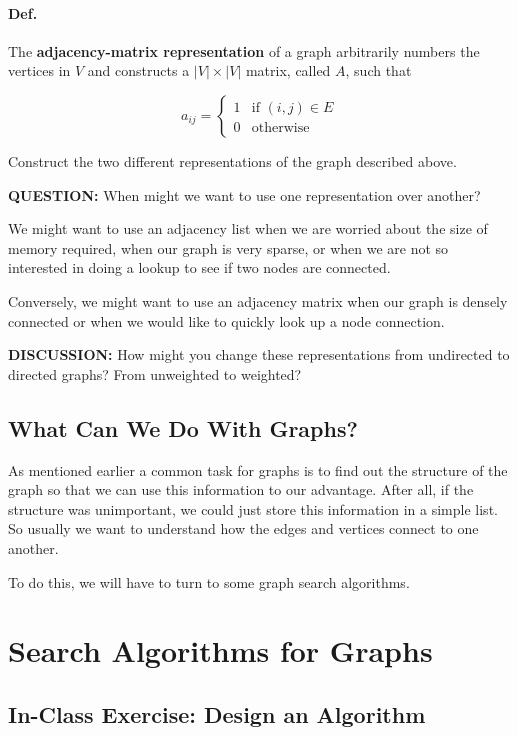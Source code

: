 \documentclass[12pt]{article}
\begin{document}
\paragraph{Def.} The \textbf{adjacency-matrix representation} of a graph arbitrarily numbers the vertices in $V$ and constructs a $|V| \times |V|$ matrix, called $A$, such that 

\begin{equation}
    a_{ij}=
    \begin{cases}
        1 & \text{if } (i, j) \in E\\
        0 & \text{otherwise}
    \end{cases}
\end{equation}

Construct the two different representations of the graph described above.

\textbf{QUESTION:} When might we want to use one representation over another? 

We might want to use an adjacency list when we are worried about the size of memory required, when our graph is very sparse, or when we are not so interested in doing a lookup to see if two nodes are connected.

Conversely, we might want to use an adjacency matrix when our graph is densely connected or when we would like to quickly look up a node connection. 

\textbf{DISCUSSION:} How might you change these representations from undirected to directed graphs? From unweighted to weighted? 

\subsection*{What Can We Do With Graphs?}

As mentioned earlier a common task for graphs is to find out the structure of the graph so that we can use this information to our advantage. After all, if the structure was unimportant, we could just store this information in a simple list. So usually we want to understand how the edges and vertices connect to one another. 

To do this, we will have to turn to some graph search algorithms. 

\section*{Search Algorithms for Graphs}

\subsection*{In-Class Exercise: Design an Algorithm}
\end{document}
